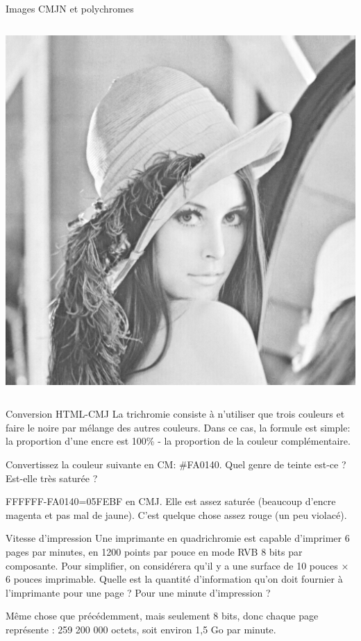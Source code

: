 \begin{frame}{Images CMJN et polychromes}
\begin{columns}
\begin{column}{.15\linewidth}
      \includegraphics[width=\linewidth]{img/06/lena-CMJN-noir}\\
    \end{column}
  \end{columns}
\end{frame}
\begin{exercice}
  \begin{exercicelet}{Conversion HTML-CMJ}
    La trichromie consiste à n'utiliser que trois couleurs et faire le noire
    par mélange des autres couleurs. Dans ce cas, la formule est simple: la
    proportion d'une encre est 100\% - la proportion de la couleur
    complémentaire.

    Convertissez la couleur suivante en CM: \#FA0140. Quel genre de teinte
    est-ce ?  Est-elle très saturée ?
    \begin{xcorrection}
      FFFFFF-FA0140=05FEBF en CMJ. Elle est assez saturée (beaucoup d'encre
      magenta et pas mal de jaune). C'est quelque chose assez rouge (un peu
      violacé).
    \end{xcorrection}
  \end{exercicelet}
  \begin{exercicelet}{Vitesse d'impression}
    Une imprimante en quadrichromie est capable d'imprimer 6 pages par
    minutes, en 1200 points par pouce en mode RVB 8 bits par composante. Pour
    simplifier, on considérera qu'il y a une surface de 10 pouces × 6 pouces
    imprimable. Quelle est la quantité d'information qu'on doit fournier à
    l'imprimante pour une page ? Pour une minute d'impression ?
    \begin{xcorrection}
      Même chose que précédemment, mais seulement 8 bits, donc chaque page
      représente : 259 200 000 octets, soit environ 1,5 Go par minute.
    \end{xcorrection}
  \end{exercicelet}
\end{exercice}
